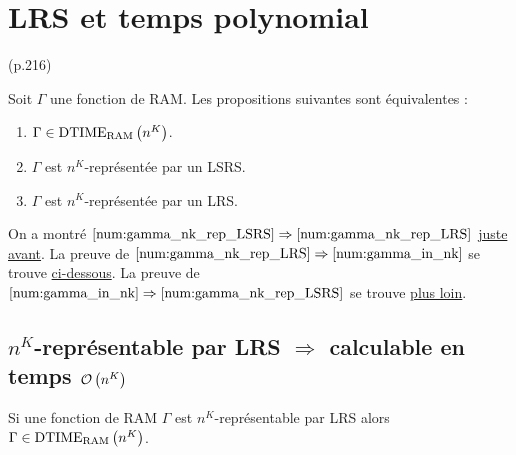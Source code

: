 		
	\section{LRS et temps polynomial} (p.216)
		\label{sec:LRS_et_temps_poly}
	
	\begin{conj}
		\label{conj:big_theorem}
		Soit $\Gamma$ une fonction de RAM. Les propositions suivantes sont équivalentes :
		
		\begin{enumerate}[itemsep=-1mm]
			\item 	\label{num:gamma_in_nk}
				$\Gamma \in \text{DTIME}_{\text{RAM}}\left( n^{K} \right)$.
				
			\item 	\label{num:gamma_nk_rep_LSRS}
				$\Gamma$ est $n^K$-représentée par un LSRS.
				
			\item	\label{num:gamma_nk_rep_LRS}
				$\Gamma$ est $n^K$-représentée par un LRS.
		\end{enumerate}
	\end{conj}
	
	On a montré $\ref{num:gamma_nk_rep_LSRS} \Rightarrow \ref{num:gamma_nk_rep_LRS}$ \hyperref[conj:rep_LSRS_rep_LRS]{juste avant}. 
	La preuve de $\ref{num:gamma_nk_rep_LRS} \Rightarrow \ref{num:gamma_in_nk}$ se trouve \hyperref[conj:rep_LRS_calc_n_K]{ci-dessous}.
	La preuve de $\ref{num:gamma_in_nk} \Rightarrow \ref{num:gamma_nk_rep_LSRS}$ se trouve \hyperref[conj:poly_implique_LSRS]{plus loin}.
	
	
	\subsection{$n^K$-représentable par LRS $\Rightarrow$ calculable en temps $\mathcal{O}\left( n^K \right)$}
		\label{subsec:LRS_implique_poly}
		
		\begin{conj}
			\label{conj:rep_LRS_calc_n_K}
			Si une fonction de RAM $\Gamma$ est $n^K$-représentable par LRS alors $\Gamma \in \text{DTIME}_{\text{RAM}}\left( n^{K} \right)$.
		\end{conj}
		
